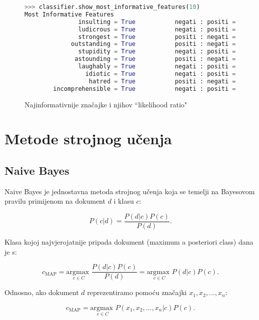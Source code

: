 \documentclass[conference]{IEEEtran}
\begin{document}
\begin{figure}[!ht]
\begin{minipage}{0.5\textwidth}
\centering
\begin{lstlisting}[language = Python, frame = single, basicstyle=\tiny\ttfamily, xleftmargin = 5pt, xrightmargin = 5pt]
>>> classifier.show_most_informative_features(10)
Most Informative Features
               insulting = True           negati : positi =     16.9 : 1.0
               ludicrous = True           negati : positi =     12.5 : 1.0
               strongest = True           positi : negati =     11.8 : 1.0
             outstanding = True           positi : negati =     11.5 : 1.0
               stupidity = True           negati : positi =     11.3 : 1.0
              astounding = True           positi : negati =     11.1 : 1.0
               laughably = True           negati : positi =     10.9 : 1.0
                 idiotic = True           negati : positi =     10.5 : 1.0
                  hatred = True           positi : negati =     10.4 : 1.0
        incomprehensible = True           negati : positi =      8.9 : 1.0
\end{lstlisting}
\caption{Najinformativnije značajke i njihov ``likelihood ratio"}
\end{minipage}
\end{figure}

\section{Metode strojnog učenja}

\subsection{Naive Bayes}

Naive Bayes je jednostavna metoda strojnog učenja koja se temelji na Bayesovom pravilu primijenom na dokument $d$ i klasu $c$:

\[P(c|d) = \frac{P(d|c)P(c)}{P(d)}.\]

Klasa kojoj najvjerojatnije pripada dokument (maximum a posteriori class) dana je s:

\[c_{\text{MAP}} = \underset{{c \in C}}{\text{argmax }} \frac{P(d|c)P(c)}{P(d)}
= \underset{{c \in C}}{\text{argmax }} P(d|c)P(c).\] 

Odnosno, ako dokument $d$ reprezentiramo pomoću značajki $x_1, x_2, \ldots, x_n$:

\[c_{\text{MAP}} = \underset{{c \in C}}{\text{argmax }} P(x_1, x_2, \ldots, x_n|c)P(c).\]
\end{document}
